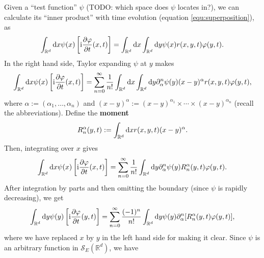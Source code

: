\documentclass{book}
\newcommand{\assign}{:=}
\newcommand{\mathd}{\mathrm{d}}
\newcommand{\mathi}{\mathrm{i}}
\newcommand{\tmstrong}[1]{\textbf{#1}}
\begin{document}
Given a ``test function'' $\psi$ (TODO: which space does $\psi$ locates in?),
we can calculate its ``inner product'' with time evolution (equation
\ref{equ:superposition}), as
\[ \int_{\mathbb{R}^d} \mathd x \psi (x)  \left[ \mathi \frac{\partial
   \varphi}{\partial t} (x, t) \right] = \int_{\mathbb{R}^d} \mathd x
   \int_{\mathbb{R}^d} \mathd y \psi (x) {\color[HTML]{000000}r (x, y, t)}
   \varphi (y, t) . \]
In the right hand side, Taylor expanding $\psi$ at $y$ makes
\[ \int_{\mathbb{R}^d} \mathd x \psi (x)  \left[ \mathi \frac{\partial
   \varphi}{\partial t} (x, t) \right] = \sum_{n = 0}^{\infty} \frac{1}{n!} 
   \int_{\mathbb{R}^d} \mathd x \int_{\mathbb{R}^d} \mathd y
   \partial^n_{\alpha} \psi (y)  (x - y)^{\alpha} {\color[HTML]{000000}r (x,
   y, t)} \varphi (y, t), \]
where $\alpha \assign (\alpha_1, \ldots, \alpha_n)$ and $(x - y)^{\alpha}
\assign (x - y)^{\alpha_1} \times \cdots \times (x - y)^{\alpha_n}$ (recall
the abbreviations). Define the {\tmstrong{moment}}
\begin{equation}
  {\color[HTML]{000000}R_n^{\alpha}  (y, t)} \assign \int_{\mathbb{R}^d}
  \mathd x {\color[HTML]{000000}r (x, y, t)} (x - y)^{\alpha} .
  \label{eq:moment}
\end{equation}
Then, integrating over $x$ gives
\[ \int_{\mathbb{R}^d} \mathd x \psi (x)  \left[ \mathi \frac{\partial
   \varphi}{\partial t} (x, t) \right] = \sum_{n = 0}^{\infty} \frac{1}{n!} 
   \int_{\mathbb{R}^d} \mathd y \partial^n_{\alpha} \psi (y)
   {\color[HTML]{000000}R^{\alpha}_n  (y, t)} \varphi (y, t) . \]
After integration by parts and then omitting the boundary (since $\psi$ is
rapidly decreasing), we get
\[ \int_{\mathbb{R}^d} \mathd y \psi (y)  \left[ \mathi \frac{\partial
   \varphi}{\partial t} (y, t) \right] = \sum_{n = 0}^{\infty} \frac{(-
   1)^n}{n!}  \int_{\mathbb{R}^d} \mathd y \psi (y) \partial^n_{\alpha}
   [{\color[HTML]{000000}R^{\alpha}_n (y, t)} \varphi (y, t)], \]
where we have replaced $x$ by $y$ in the left hand side for making it clear.
Since $\psi$ is an arbitrary function in $\mathcal{S}_E (\mathbb{R}^d)$, we
have
\end{document}
